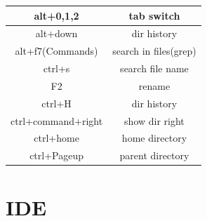 \documentclass[a4paper,11pt,twoside]{book}
\begin{document}
\begin{itemize}
\begin{tabular}{|c|c|}
		\hline 
		alt+0,1,2 & tab switch  \\ 
		\hline 
		alt+down & dir history  \\ 
		
		\hline 
		alt+f7(Commands) & search in files(grep) \\ 
		\hline 
		ctrl+s  & search file name \\ 
		\hline 
		F2  & rename \\ 
		\hline
		ctrl+H  & dir history \\ 
		
		\hline 
		ctrl+command+right  & show dir right  \\ 
		\hline 
		ctrl+home  & home directory \\ 
		\hline 
		ctrl+Pageup  & parent directory  \\ 
		\hline 
		
	\end{tabular} 
\end{itemize}


\section{IDE}
\end{document}
